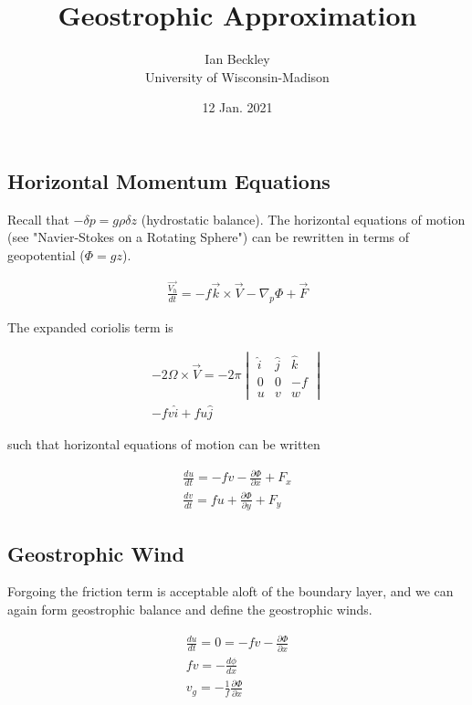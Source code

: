 \documentclass[a4paper,12pt]{article}
\begin{document}
\title{\vspace{-4.0cm}Geostrophic Approximation}
\author{Ian Beckley
\\University of Wisconsin-Madison}

\date{12 Jan. 2021}

\maketitle

\subsection*{Horizontal Momentum Equations}
Recall that $-\delta p = g\rho\delta z$ (hydrostatic balance). The horizontal equations of motion (see "Navier-Stokes on a Rotating Sphere") can be rewritten in terms of geopotential ($\Phi = gz$).

\begin{align}
\frac{\vec{V_h}}{dt} = -f\vec{k} \times \vec{V} - \nabla_p \Phi + \vec{F}
\end{align}

The expanded coriolis term is

\begin{align}
-2\Omega \times \vec{V} = -2\pi\begin{vmatrix} \hat{i} & \hat{j} & \hat{k} \\ 0 & 0 & -f \\  u & v & w \end{vmatrix}\\
-fv \hat{i} + fu \hat{j}
\end{align}

such that horizontal equations of motion can be written

\begin{align}
\frac{du}{dt} = -fv - \frac{\partial \Phi}{\partial x} + F_x\\
\frac{dv}{dt} = fu + \frac{\partial \Phi}{\partial y} + F_y
\end{align}

\subsection*{Geostrophic Wind}
Forgoing the friction term is acceptable aloft of the boundary layer, and we can again form geostrophic balance and define the geostrophic winds.

\begin{align}
\frac{du}{dt} = 0 = -fv - \frac{\partial \Phi}{\partial x}\\
fv = -\frac{d\phi}{dx}\\
\boxed{v_g = -\frac{1}{f}\frac{\partial \Phi}{\partial x}}
\end{align}
\end{document}
